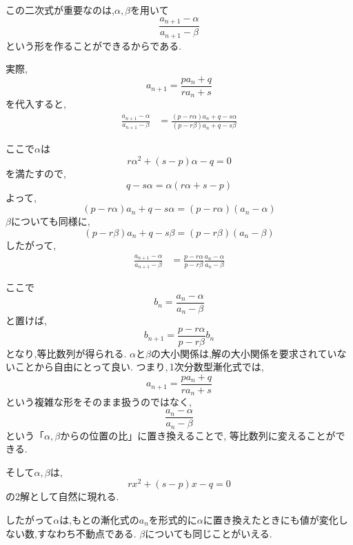 この二次式が重要なのは,$\alpha,\beta$を用いて
\[
  \frac{a_{n+1}-\alpha}{a_{n+1}-\beta}
\]
という形を作ることができるからである.

実際,
\[
  a_{n+1}=\frac{pa_n+q}{ra_n+s}
\]
を代入すると,
\begin{align*}
  \frac{a_{n+1}-\alpha}{a_{n+1}-\beta}
   & =
  \frac{(p-r\alpha)a_n+q-s\alpha}{(p-r\beta)a_n+q-s\beta}
\end{align*}

ここで$\alpha$は
\[
  r\alpha^2+(s-p)\alpha-q=0
\]
を満たすので,
\[
  q-s\alpha
  =\alpha(r\alpha+s-p)
\]
よって,
\[
  (p-r\alpha)a_n+q-s\alpha
  =(p-r\alpha)(a_n-\alpha)
\]
$\beta$についても同様に,
\[
  (p-r\beta)a_n+q-s\beta
  =(p-r\beta)(a_n-\beta)
\]
したがって,
\begin{align*}
  \frac{a_{n+1}-\alpha}{a_{n+1}-\beta}
   & =
  \frac{p-r\alpha}{p-r\beta}
  \frac{a_n-\alpha}{a_n-\beta}
\end{align*}

ここで
\[
  b_n=\frac{a_n-\alpha}{a_n-\beta}
\]
と置けば,
\[
  b_{n+1}
  =
  \frac{p-r\alpha}{p-r\beta}b_n
\]
となり,等比数列が得られる.
$\alpha$と$\beta$の大小関係は,解の大小関係を要求されていないことから自由にとって良い.
つまり,\,1次分数型漸化式では,
\[
  a_{n+1}=\frac{pa_n+q}{ra_n+s}
\]
という複雑な形をそのまま扱うのではなく,
\[
  \frac{a_n-\alpha}{a_n-\beta}
\]
という「$\alpha,\beta$からの位置の比」に置き換えることで,
等比数列に変えることができる.

そして$\alpha,\beta$は,
\[
  rx^2+(s-p)x-q=0
\]
の2解として自然に現れる.

したがって$\alpha$は,もとの漸化式の$a_n$を形式的に$\alpha$に置き換えたときにも値が変化しない数,すなわち不動点である.
$\beta$についても同じことがいえる.

